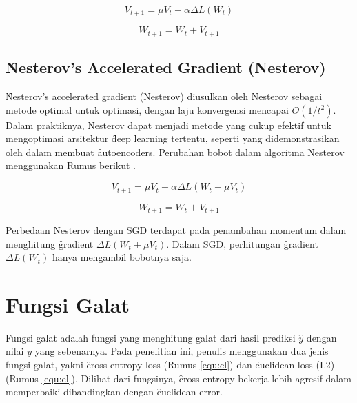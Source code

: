 \begin{equation}
\label{equ:sgd2}
V_{t+1} = \mu V_{t} - \alpha \Delta L(W_{t})
\end{equation}

\begin{equation}
\label{equ:sgd2-3}
W_{t+1} = W_{t} + V_{t+1}
\end{equation}
\subsection{\f{Nesterov's Accelerated Gradient} (Nesterov)}
\f{Nesterov's accelerated gradient} (Nesterov) diusulkan oleh Nesterov sebagai metode optimal untuk optimasi, dengan laju konvergensi mencapai $O(1/t^{2})$. Dalam praktiknya, Nesterov dapat menjadi metode yang cukup efektif untuk mengoptimasi arsitektur \f{deep learning} tertentu, seperti yang didemonstrasikan oleh  dalam membuat \f{autoencoders}. Perubahan bobot dalam algoritma Nesterov menggunakan Rumus berikut .

\begin{equation}
\label{equ:nesterov}
V_{t+1}=\mu V_{t} - \alpha\Delta L(W_{t} + \mu V_{t})
\end{equation}

\begin{equation}
W_{t+1} = W_{t} + V_{t+1}
\end{equation}

Perbedaan Nesterov dengan SGD terdapat pada penambahan momentum dalam menghitung \f{gradient} $\Delta L(W_{t} + \mu V_{t})$. Dalam SGD, perhitungan \f{gradient} $\Delta L(W_{t})$ hanya mengambil bobotnya saja.

\section{Fungsi Galat}
Fungsi galat adalah fungsi yang menghitung galat dari hasil prediksi $\hat{y}$ dengan nilai $y$ yang sebenarnya. Pada penelitian ini, penulis menggunakan dua jenis fungsi galat, yakni \f{cross-entropy loss} (Rumus \ref{equ:cl}) dan \f{euclidean loss} (L2) (Rumus \ref{equ:el}). Dilihat dari fungsinya, \f{cross entropy} bekerja lebih agresif dalam memperbaiki dibandingkan dengan \f{euclidean error}.

